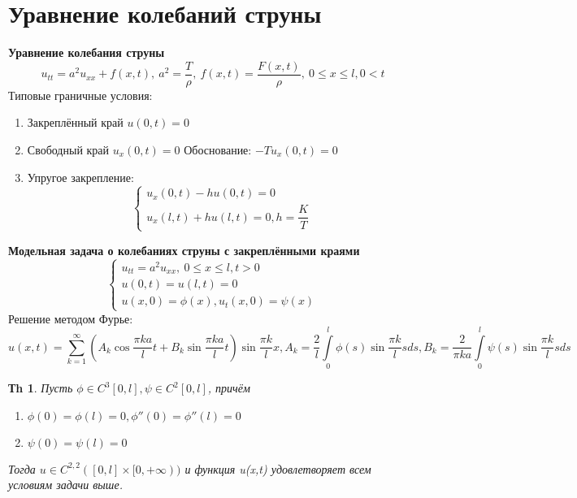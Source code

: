 \documentclass[14pt]{article}
\theoremstyle{plain}
\newtheorem{Thm}{Тh}
\theoremstyle{definition}
\begin{document}
		
		\section{Уравнение колебаний струны}
			\textbf{Уравнение колебания струны}
				$$
					u_{tt} = a^2 u_{xx} + f(x,t), \ a^2 = \dfrac{T}{\rho}, \ f(x,t) = \dfrac{F(x,t)}{\rho}, \ 0 \leq x \leq l, 0 < t
				$$
				Типовые граничные условия:
				\begin{enumerate}
					\item Закреплённый край $u(0,t) = 0$
					\item Свободный край $u_x(0,t) = 0$ Обоснование: $-Tu_x(0,t) = 0$
					\item Упругое закрепление: \begin{equation*}
						\begin{cases}
							u_x(0,t) - hu(0,t) = 0\\
							u_x(l,t) + hu(l,t) = 0 , h = \dfrac{K}{T}
						\end{cases}
					\end{equation*}
				\end{enumerate}
			\textbf{Модельная задача о колебаниях струны с закреплёнными краями} 
			\begin{equation*}
						\left\{ 
				\begin{array}{ll} 
					u_{tt} = a^2 u_{xx}, \ 0 \leq x \leq l, t > 0\\
					u(0,t) = u(l,t) = 0\\
					u(x,0) = \phi(x), u_t(x,0) = \psi(x)  \end{array}\right.
			\end{equation*}
			Решение методом Фурье:
			\begin{equation*}
				u(x,t) = \sum\limits_{k=1}^{\infty} (A_k \cos{\dfrac{\pi k a}{l}t} + B_k \sin{\dfrac{\pi k a}{l}t} ) \sin{\dfrac{\pi k}{l}x} , 
				A_k = \dfrac{2}{l}\int\limits_{0}^{l} \phi(s)\sin{\dfrac{\pi k}{l}s}ds, B_k = \dfrac{2}{\pi k a} \int\limits_{0}^{l} \psi(s)\sin{\dfrac{\pi k}{l}s}ds
			\end{equation*}
			\begin{Thm}
				Пусть $\phi \in C^3[0,l], \psi \in C^2[0,l]$, причём \begin{enumerate}
					\item $\phi(0) = \phi(l) = 0, \phi''(0) = \phi''(l) = 0$
					\item $\psi(0) = \psi(l) = 0$
				\end{enumerate}
				Тогда $u \in C^{2,2} ([0,l] \times [0, +\infty))$ и функция u(x,t) удовлетворяет всем условиям задачи выше. 
			\end{Thm}
\end{document}
